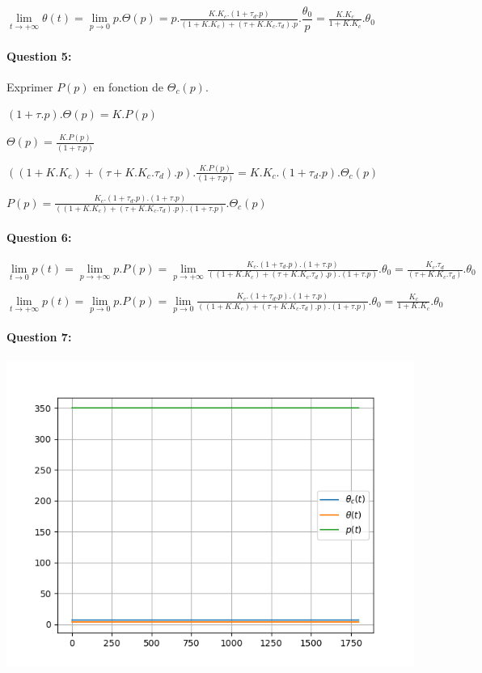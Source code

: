 $\lim\limits_{t\rightarrow +\infty}\theta(t)=\lim\limits_{p\rightarrow 0}p.\Theta(p)=p.\frac{K.K_c.\left(1+\tau_d.p\right)}{(1+K.K_c)+(\tau+K.K_c.\tau_d).p}.\dfrac{\theta_0}{p}=\frac{K.K_c}{1+K.K_c}.\theta_0$

\paragraph{Question 5:} Exprimer $P(p)$ en fonction de $\Theta_c(p)$.

$\left(1+\tau.p\right).\Theta(p)=K.P(p)$

$\Theta(p)=\frac{K.P(p)}{\left(1+\tau.p\right)}$

$\left((1+K.K_c)+(\tau+K.K_c.\tau_d).p\right).\frac{K.P(p)}{\left(1+\tau.p\right)}=K.K_c.\left(1+\tau_d.p\right).\Theta_c(p)$

$P(p)=\frac{K_c.\left(1+\tau_d.p\right).\left(1+\tau.p\right)}{\left((1+K.K_c)+(\tau+K.K_c.\tau_d).p\right).\left(1+\tau.p\right)}.\Theta_c(p)$

\paragraph{Question 6:}

$\lim\limits_{t\rightarrow 0}p(t)=\lim\limits_{p\rightarrow +\infty}p.P(p)=\lim\limits_{p\rightarrow +\infty}\frac{K_c.\left(1+\tau_d.p\right).\left(1+\tau.p\right)}{\left((1+K.K_c)+(\tau+K.K_c.\tau_d).p\right).\left(1+\tau.p\right)}.\theta_0=\frac{K_c.\tau_d}{\left(\tau+K.K_c.\tau_d\right)}.\theta_0$

$\lim\limits_{t\rightarrow +\infty}p(t)=\lim\limits_{p\rightarrow 0}p.P(p)=\lim\limits_{p\rightarrow 0}\frac{K_c.\left(1+\tau_d.p\right).\left(1+\tau.p\right)}{\left((1+K.K_c)+(\tau+K.K_c.\tau_d).p\right).\left(1+\tau.p\right)}.\theta_0=\frac{K_c}{1+K.K_c}.\theta_0$

\paragraph{Question 7:}

\begin{center}
 \includegraphics[width=0.8\linewidth]{img/trace_exo_6}
\end{center}




